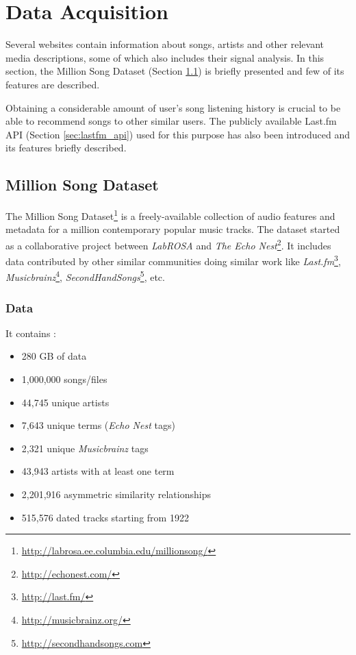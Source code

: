 \chapter{Data Acquisition}
	Several websites contain information about songs, artists and other relevant media descriptions, some of which also includes their signal analysis. In this section, the Million Song Dataset (Section \ref{sec:million_song_dataset}) is briefly presented and few of its features are described.
	
	Obtaining a considerable amount of user's song listening history is crucial to be able to recommend songs to other similar users. The publicly available Last.fm API (Section \ref{sec:lastfm_api}) used for this purpose has also been introduced and its features briefly described.
	
	\section{Million Song Dataset}
	\label{sec:million_song_dataset}
		The Million Song Dataset\footnote{\url{http://labrosa.ee.columbia.edu/millionsong/}} is a freely-available collection of audio features and metadata for a million contemporary popular music tracks. The dataset started as a collaborative project between \emph{LabROSA} and \emph{The Echo Nest}\footnote{\url{http://echonest.com/}}. It includes data contributed by other similar communities doing similar work like \emph{Last.fm}\footnote{\url{http://last.fm/}}, \emph{Musicbrainz}\footnote{\url{http://musicbrainz.org/}}, \emph{SecondHandSongs}\footnote{\url{http://secondhandsongs.com}}, etc.
		
		\subsection{Data}
			It contains \cite{Bertin-Mahieux2011}:
\begin{itemize}
	\item 280 GB of data
	\item 1,000,000 songs/files
	\item 44,745 unique artists
	\item 7,643 unique terms (\emph{Echo Nest} tags)
	\item 2,321 unique \emph{Musicbrainz} tags
	\item 43,943 artists with at least one term
	\item 2,201,916 asymmetric similarity relationships
	\item 515,576 dated tracks starting from 1922
\end{itemize}


